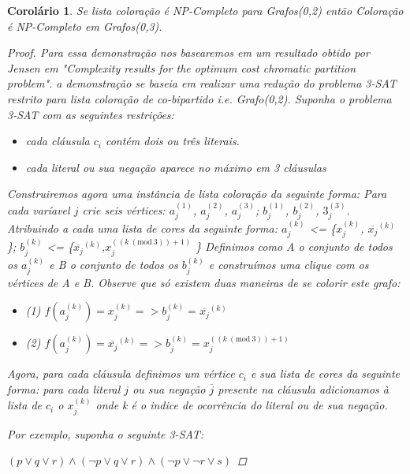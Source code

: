 \documentclass[a4paper,oneside,12pt]{book}
\newtheorem{corolario}{Corolário}
\newcommand{\Mod}[1]{\ (\mathrm{mod}\ #1)}
\begin{document}
    \begin{corolario}
    Se lista coloração é NP-Completo para Grafos(0,2) então Coloração é NP-Completo em Grafos(0,3).
    \begin{proof}
    Para essa demonstração nos basearemos em um resultado obtido por Jensen em "Complexity results for the optimum cost chromatic partition problem". a demonstração se baseia em realizar uma redução do problema 3-SAT restrito para lista coloração de co-bipartido i.e. Grafo(0,2).
    Suponha o problema 3-SAT com as seguintes restrições:
    \begin{itemize}
      \item cada cláusula $c_i$ contém dois ou três literais.
      \item cada literal ou sua negação aparece no máximo em 3 cláusulas
    \end{itemize}
    Construiremos agora uma instância de lista coloração da seguinte forma:\newline
    Para cada varíavel $j$ crie seis vértices:
    $a_j^{(1)}$, $a_j^{(2)}$, $a_j^{(3)}$;
    $b_j^{(1)}$, $b_j^{(2)}$, $3_j^{(3)}$. Atribuindo a cada uma lista de cores da seguinte forma:\newline
    $a_j^{(k)}$ <= \{$x_j^{(k)}$, $\overline{x_j}^{(k)}$ \}; $b_j^{(k)}$ <= \{$\overline{x_j}^{(k)}$,$x_j^{((k \Mod{3}) + 1 )}$ \}\newline
    Definimos como A o conjunto de todos os $a_j^{(k)}$ e B o conjunto de todos os $b_j^{(k)}$ e construímos uma clique com os vértices de A e B. Observe que só existem duas maneiras de se colorir este grafo:
    \begin{itemize}
      \item (1)  $f(a_j^{(k)}) = x_j^{(k)} => b_j^{(k)} = \overline{x_j}^{(k)}$
      \item (2)  $f(a_j^{(k)}) = \overline{x_j}^{(k)} => b_j^{(k)} = x_j^{((k \Mod{3}) + 1 )}$
    \end{itemize}
    Agora, para cada cláusula definimos um vértice $c_i$ e sua lista de cores da seguinte forma: para cada literal $j$ ou sua negação $\overline{j}$ presente na cláusula adicionamos à lista de $c_i$ o $x_j^{(k)}$ onde k é o indice de ocorrência do literal ou de sua negação.
    
    Por exemplo, suponha o seguinte 3-SAT:
    
    $(p \lor q \lor r) \land (\neg{p} \lor q \lor r) \land (\neg{p} \lor \neg{r} \lor s)$
    

\end{proof}
\end{corolario}
\end{document}
